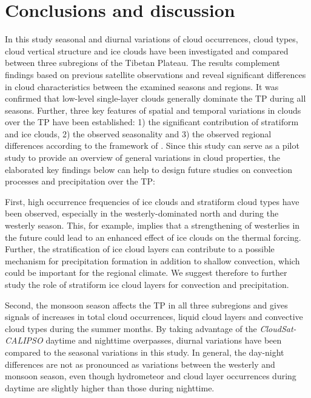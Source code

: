 \documentclass[alpha-refs]{wiley-article}
\begin{document}
\section{Conclusions and discussion}


In this study seasonal and diurnal variations of cloud occurrences, cloud types, cloud vertical structure and ice clouds have been investigated and compared between three subregions of the Tibetan Plateau. The results complement findings based on previous satellite observations and reveal significant differences in cloud characteristics between the examined seasons and regions. 
It was confirmed that low-level single-layer clouds generally dominate the TP during all seasons. Further, three key features of spatial and temporal variations in clouds over the TP have been established: 1) the significant contribution of stratiform and ice clouds, 2) the observed seasonality and 3) the observed regional differences according to the framework of \citet{cu13_2}. Since this study can serve as a pilot study to provide an overview of general variations in cloud properties, the elaborated key findings below can help to design future studies on convection processes and precipitation over the TP:


First, high occurrence frequencies of ice clouds and stratiform cloud types have been observed, especially in the westerly-dominated north and during the westerly season. This, for example, implies that a strengthening of westerlies in the future could lead to an enhanced effect of ice clouds on the thermal forcing. Further, the stratification of ice cloud layers can contribute to a possible mechanism for precipitation formation in addition to shallow convection, which could be important for the regional climate. We suggest therefore to further study the role of stratiform ice cloud layers for convection and precipitation.


Second, the monsoon season affects the TP in all three subregions and gives signals of increases in total cloud occurrences, liquid cloud layers and convective cloud types during the summer months. By taking advantage of the \textit{CloudSat-CALIPSO} daytime and nighttime overpasses, diurnal variations have been compared to the seasonal variations in this study. In general, the day-night differences are not as pronounced as variations between the westerly and monsoon season, even though hydrometeor and cloud layer occurrences during daytime are slightly higher than those during nighttime. 
\end{document}
